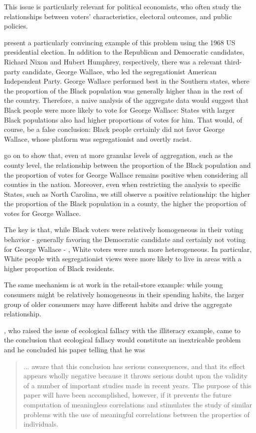 This issue is particularly relevant for political economists, who often study the relationships between voters' characteristics, electoral outcomes, and public policies.

\citet{kuriwaki2026roleconfounderslinearityecological} present a particularly convincing example of this problem using the 1968 US presidential election. In addition to the Republican and Democratic candidates, Richard Nixon and Hubert Humphrey, respectively, there was a relevant third-party candidate, George Wallace, who led the segregationist American Independent Party.
George Wallace performed best in the Southern states, where the proportion of the Black population was generally higher than in the rest of the country. Therefore, a naive analysis of the aggregate data would suggest that Black people were more likely to vote for George Wallace: States with larger Black populations also had higher proportions of votes for him.
That would, of course, be a false conclusion: Black people certainly did not favor George Wallace, whose platform was segregationist and overtly racist.

\citet{kuriwaki2026roleconfounderslinearityecological} go on to show that, even at more granular levels of aggregation, such as the county level, the relationship between the proportion of the Black population and the proportion of votes for George Wallace remains positive when considering all counties in the nation. Moreover, even when restricting the analysis to specific States, such as North Carolina, we still observe a positive relationship: the higher the proportion of the Black population in a county, the higher the proportion of votes for George Wallace.

The key is that, while Black voters were relatively homogeneous in their voting behavior - generally favoring the Democratic candidate and certainly not voting for George Wallace - , White voters were much more heterogeneous. In particular, White people with segregationist views were more likely to live in areas with a higher proportion of Black residents.

The same mechanism is at work in the retail-store example: while young consumers might be relatively homogeneous in their spending habits, the larger group of older consumers may have different habits and drive the aggregate relationship.


\citet{Robinson1950}, who raised the issue of ecological fallacy with the illiteracy example, came to the conclusion that ecological fallacy would constitute an inextricable problem and he concluded his paper telling that he was 
\begin{quotation} ... aware that this conclusion has serious consequences, and that its effect appears wholly negative because it throws serious doubt upon the validity of a number of important studies made in recent years. The purpose of this paper will have been accomplished, however, if it prevents the future computation of meaningless correlations and stimulates the study of similar problems with the use of meaningful correlations between the properties of individuals.
\end{quotation}

